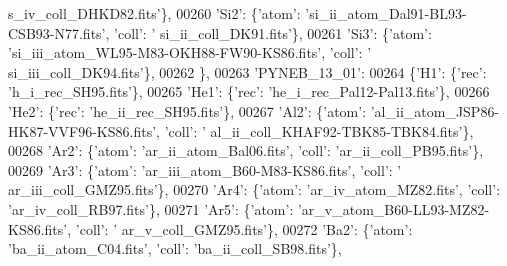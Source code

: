 \begin{DoxyCode}
{      s\_iv\_coll\_DHKD82.fits'}\},
00260                             \textcolor{stringliteral}{'Si2'}: \{\textcolor{stringliteral}{'atom'}: \textcolor{stringliteral}{'si\_ii\_atom\_Dal91-BL93-CSB93-N77.fits'}, \textcolor{stringliteral}{'coll'}: \textcolor{stringliteral}{'
      si\_ii\_coll\_DK91.fits'}\},
00261                             \textcolor{stringliteral}{'Si3'}: \{\textcolor{stringliteral}{'atom'}: \textcolor{stringliteral}{'si\_iii\_atom\_WL95-M83-OKH88-FW90-KS86.fits'}, \textcolor{stringliteral}{'coll'}: \textcolor{stringliteral}{'
      si\_iii\_coll\_DK94.fits'}\},
00262                             \},
00263                            \textcolor{stringliteral}{'PYNEB\_13\_01'}:
00264                             \{\textcolor{stringliteral}{'H1'}: \{\textcolor{stringliteral}{'rec'}: \textcolor{stringliteral}{'h\_i\_rec\_SH95.fits'}\},
00265                              \textcolor{stringliteral}{'He1'}: \{\textcolor{stringliteral}{'rec'}: \textcolor{stringliteral}{'he\_i\_rec\_Pal12-Pal13.fits'}\},
00266                              \textcolor{stringliteral}{'He2'}: \{\textcolor{stringliteral}{'rec'}: \textcolor{stringliteral}{'he\_ii\_rec\_SH95.fits'}\},
00267                              \textcolor{stringliteral}{'Al2'}: \{\textcolor{stringliteral}{'atom'}: \textcolor{stringliteral}{'al\_ii\_atom\_JSP86-HK87-VVF96-KS86.fits'}, \textcolor{stringliteral}{'coll'}: \textcolor{stringliteral}{'
      al\_ii\_coll\_KHAF92-TBK85-TBK84.fits'}\},
00268                              \textcolor{stringliteral}{'Ar2'}: \{\textcolor{stringliteral}{'atom'}: \textcolor{stringliteral}{'ar\_ii\_atom\_Bal06.fits'}, \textcolor{stringliteral}{'coll'}: \textcolor{stringliteral}{'ar\_ii\_coll\_PB95.fits'}\},
00269                              \textcolor{stringliteral}{'Ar3'}: \{\textcolor{stringliteral}{'atom'}: \textcolor{stringliteral}{'ar\_iii\_atom\_B60-M83-KS86.fits'}, \textcolor{stringliteral}{'coll'}: \textcolor{stringliteral}{'
      ar\_iii\_coll\_GMZ95.fits'}\},
00270                              \textcolor{stringliteral}{'Ar4'}: \{\textcolor{stringliteral}{'atom'}: \textcolor{stringliteral}{'ar\_iv\_atom\_MZ82.fits'}, \textcolor{stringliteral}{'coll'}: \textcolor{stringliteral}{'ar\_iv\_coll\_RB97.fits'}\},
00271                              \textcolor{stringliteral}{'Ar5'}: \{\textcolor{stringliteral}{'atom'}: \textcolor{stringliteral}{'ar\_v\_atom\_B60-LL93-MZ82-KS86.fits'}, \textcolor{stringliteral}{'coll'}: \textcolor{stringliteral}{'
      ar\_v\_coll\_GMZ95.fits'}\},
00272                              \textcolor{stringliteral}{'Ba2'}: \{\textcolor{stringliteral}{'atom'}: \textcolor{stringliteral}{'ba\_ii\_atom\_C04.fits'}, \textcolor{stringliteral}{'coll'}: \textcolor{stringliteral}{'ba\_ii\_coll\_SB98.fits'}\},

\end{DoxyCode}
